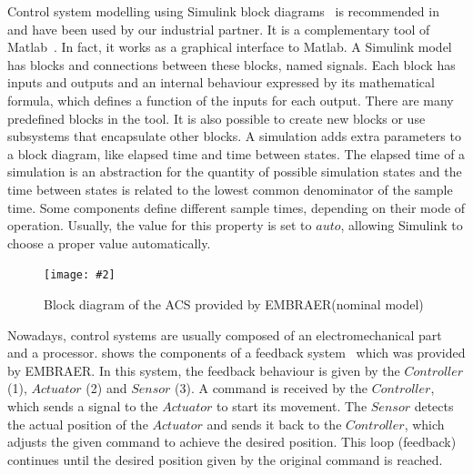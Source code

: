 \documentclass[12pt,openright,twoside,a4paper,oldfontcommands,english,brazil,final]{abntex2}
\theoremstyle{theo}
\newcommand{\includegraphicsaspectratio}[2][1]{%
  \texttt{[image: \#2]}%
}
\newcommand{\EMBRAER}{EMBRAER\xspace}
\newcommand{\matlab}{\textsf{Matlab}\xspace}
\newcommand{\textsim}[1]{$#1$}
\newcommand{\simulink}{Simulink\xspace}
\begin{document}
Control system modelling using \simulink block diagrams~\cite{MathWorks2010} is recommended in~\cite{Nise1992} and have been used by our industrial partner.
It is a complementary tool of \matlab~\cite{MathWorks2010c}.
In fact, it works as a graphical interface to \matlab.
A \simulink model has blocks and connections between these blocks, named signals.
Each block has inputs and outputs and an internal behaviour expressed by its mathematical formula, which defines a function of the inputs for each output.
There are many predefined blocks in the tool.
It is also possible to create new blocks or use subsystems that encapsulate other blocks.
A simulation adds extra parameters to a block diagram, like elapsed time and time between states.
The elapsed time of a simulation is an abstraction for the quantity of possible simulation states and the time between states is related to the lowest common denominator of the sample time.
Some components define different sample times, depending on their mode of operation.
Usually, the value for this property is set to \textsim{auto}, allowing \simulink to choose a proper value automatically.

\begin{figure}[htb]
  \centering
  \includegraphicsaspectratio{acsBlockDiagrams}
  \caption{Block diagram of the ACS provided by \EMBRAER (nominal model)}
  \label{fg:acsBlockDiagrams}
\end{figure}

Nowadays, control systems are usually composed of an electromechanical part and a processor.
 shows the components of a feedback system~\cite{AM2008} which was provided by \EMBRAER.
In this system, the feedback behaviour is given by the \textsim{Controller} (1), \textsim{Actuator} (2) and \textsim{Sensor} (3). A command is received by the \textsim{Controller}, which sends a signal to the \textsim{Actuator} to start its movement.
The \textsim{Sensor} detects the actual position of the \textsim{Actuator} and sends it back to the \textsim{Controller}, which adjusts the given command to achieve the desired position. This loop (feedback) continues until the desired position given by the original command is reached.
\end{document}
